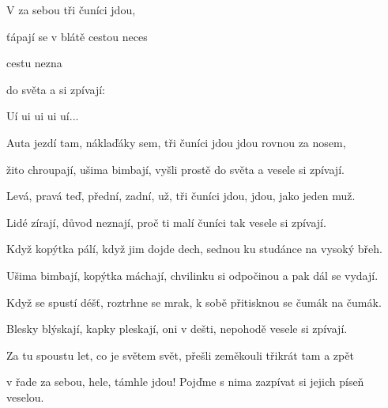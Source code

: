 

\zs
V  za sebou tři čuníci jdou,

ťápají se v blátě cestou neces

 cestu nezna

 do světa a  si zpívají:
\ks

\zr
Uí ui ui ui uí...
\kr

\zs
Auta jezdí tam, náklaďáky sem, tři čuníci jdou jdou rovnou za nosem,

žito chroupají, ušima bimbají, vyšli prostě do světa a vesele si zpívají.
\ks

\zr\kr

\zs
Levá, pravá teď, přední, zadní, už, tři čuníci jdou, jdou, jako jeden muž.

Lidé zírají, důvod neznají, proč ti malí čuníci tak vesele si zpívají.
\ks

\zr\kr

\zs
Když kopýtka pálí, když jim dojde dech, sednou ku studánce na vysoký břeh.

Ušima bimbají, kopýtka máchají, chvilinku si odpočinou a pak dál se vydají.
\ks

\zr\kr

\zs
Když se spustí déšť, roztrhne se mrak, k sobě přitisknou se čumák na čumák.

Blesky blýskají, kapky pleskají, oni v dešti, nepohodě vesele si zpívají.
\ks

\zr\kr

\zs
Za tu spoustu let, co je světem svět, přešli zeměkouli třikrát tam a zpět

v řade za sebou, hele, támhle jdou! Pojďme s nima zazpívat si jejich píseň veselou.
\ks

\zr\kr

\kp

